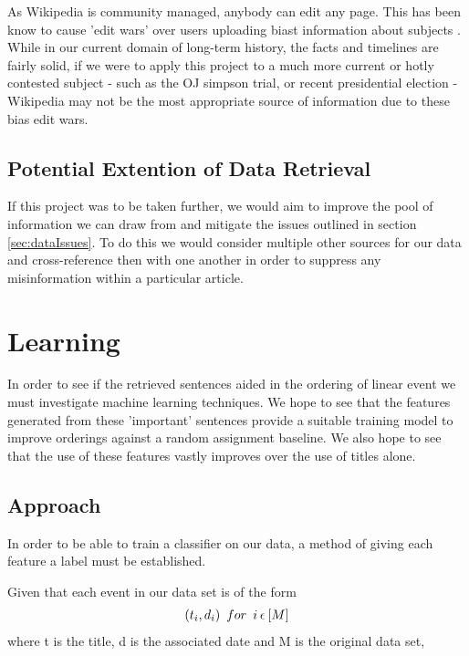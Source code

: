 \documentclass[bsc,frontabs,twoside,singlespacing,parskip,deptreport]{infthesis}     %
\begin{document}
As Wikipedia is community managed, anybody can edit any page. This has been know to cause 'edit wars' over users
uploading biast information about subjects \cite{}.
While in our current domain of long-term history, the facts and timelines are fairly solid, if we were to apply this project
to a much more current or hotly contested subject - such as the OJ simpson trial, or recent presidential election - Wikipedia
may not be the most appropriate source of information due to these bias edit wars.


\section{Potential Extention of Data Retrieval}
If this project was to be taken further, we would aim to improve the pool of information we can draw from and mitigate the issues outlined in section \ref{sec:dataIssues}.
To do this we would consider multiple other sources for our data and cross-reference then with one another in order to suppress any misinformation within
a particular article.


\chapter{Learning}
In order to see if the retrieved sentences aided in the  ordering of linear event we must investigate machine learning
techniques. We hope to see that the features generated from these 'important' sentences provide a suitable training model
to improve orderings against a random assignment baseline. We also hope to see that the use of these features vastly
improves over the use of titles alone.



\section{Approach}
In order to be able to train a classifier on our data, a method of giving each feature a label must be established.

 Given that each event in our data set is of the form
  \begin{eqnarray}
  (t_{i},d_{i}) \hspace{0.5em}for\hspace{0.5em} i \hspace{0.2em}\epsilon \hspace{0.2em} [M]\nonumber
    \end{eqnarray}
    where t is the title, d is the associated date and M is the original data set,
\end{document}
